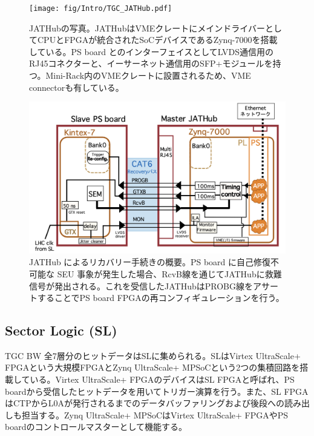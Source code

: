    \begin{figure} 
        \centering
        \texttt{[image: fig/Intro/TGC\_JATHub.pdf]}
        \caption[JATHubの写真]{JATHubの写真\cite{mt_aoki}。JATHubはVMEクレートにメインドライバーとしてCPUとFPGAが統合されたSoCデバイスであるZynq-7000を搭載している。PS board とのインターフェイスとしてLVDS通信用のRJ45コネクターと、イーサーネット通信用のSFP+モジュールを持つ。Mini-Rack内のVMEクレートに設置されるため、VME connectorも有している。}
        \label{TGC_JATHub}
    \end{figure}

    \begin{figure} 
    \centering
    \includegraphics[width=16cm]{fig/QAQC/JATHubsem.png}
    \caption[JATHub によるリカバリー手続きの概要]{JATHub によるリカバリー手続きの概要\cite{mt_atanaka}。PS board に自己修復不可能な SEU 事象が発生した場合、RcvB線を通じてJATHubに救難信号が発出される。これを受信したJATHubはPROBG線をアサートすることでPS board FPGAの再コンフィギュレーションを行う。}
    \label{JATHubsem}
    \end{figure}

        \subsection*{Sector Logic  (SL) }
TGC BW 全7層分のヒットデータはSLに集められる。SLはVirtex UltraScale+ FPGAという大規模FPGAとZynq UltraScale+ MPSoCという2つの集積回路を搭載している。Virtex UltraScale+ FPGAのデバイスはSL FPGAと呼ばれ、PS boardから受信したヒットデータを用いてトリガー演算を行う。また、SL FPGAはCTPからL0Aが発行されるまでのデータバッファリングおよび後段への読み出しも担当する。Zynq UltraScale+ MPSoCはVirtex UltraScale+ FPGAやPS boardのコントロールマスターとして機能する。


